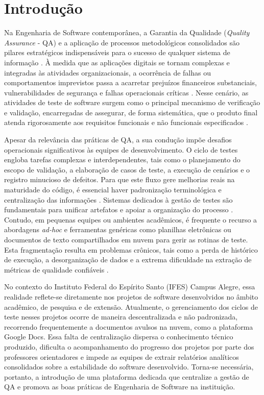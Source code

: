 \chapter{Introdução}

Na Engenharia de Software contemporânea, a Garantia da Qualidade (\textit{Quality Assurance} - QA) e a aplicação de processos metodológicos consolidados são pilares estratégicos indispensáveis para o sucesso de qualquer sistema de informação \cite{vasconcelos2006}. À medida que as aplicações digitais se tornam complexas e integradas às atividades organizacionais, a ocorrência de falhas ou comportamentos imprevistos passa a acarretar prejuízos financeiros substanciais, vulnerabilidades de segurança e falhas operacionais críticas \cite{koscianski2007}. Nesse cenário, as atividades de teste de software surgem como o principal mecanismo de verificação e validação, encarregadas de assegurar, de forma sistemática, que o produto final atenda rigorosamente aos requisitos funcionais e não funcionais especificados \cite{delamaro2016}.

Apesar da relevância das práticas de QA, a sua condução impõe desafios operacionais significativos às equipes de desenvolvimento. O ciclo de testes engloba tarefas complexas e interdependentes, tais como o planejamento do escopo de validação, a elaboração de casos de teste, a execução de cenários e o registro minucioso de defeitos. Para que este fluxo gere melhorias reais na maturidade do código, é essencial haver padronização terminológica e centralização das informações \cite{tebes2022}. Sistemas dedicados à gestão de testes são fundamentais para unificar artefatos e apoiar a organização do processo \cite{kokubum2025}. Contudo, em pequenas equipes ou ambientes acadêmicos, é frequente o recurso a abordagens \textit{ad-hoc} e ferramentas genéricas como planilhas eletrônicas ou documentos de texto compartilhados em nuvem para gerir as rotinas de teste. Esta fragmentação resulta em problemas crônicos, tais como a perda de histórico de execução, a desorganização de dados e a extrema dificuldade na extração de métricas de qualidade confiáveis \cite{medeiros2022}.

No contexto do Instituto Federal do Espírito Santo (IFES) Campus Alegre, essa realidade reflete-se diretamente nos projetos de software desenvolvidos no âmbito acadêmico, de pesquisa e de extensão. Atualmente, o gerenciamento dos ciclos de teste nesses projetos ocorre de maneira descentralizada e não padronizada, recorrendo frequentemente a documentos avulsos na nuvem, como a plataforma Google Docs. Essa falta de centralização dispersa o conhecimento técnico produzido, dificulta o acompanhamento do progresso dos projetos por parte dos professores orientadores e impede as equipes de extrair relatórios analíticos consolidados sobre a estabilidade do software desenvolvido. Torna-se necessária, portanto, a introdução de uma plataforma dedicada que centralize a gestão de QA e promova as boas práticas de Engenharia de Software na instituição.

